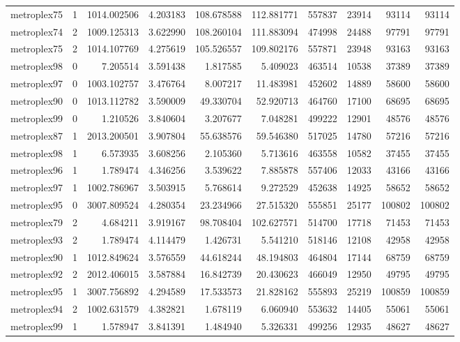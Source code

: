\begin{longtable}{|l|r|r|r|r|r|r|r|r|r|}
metroplex75 & 1 & 1014.002506 & 4.203183 & 108.678588 & 112.881771 & 557837 & 23914 & 93114 & 93114 \\
metroplex74 & 2 & 1009.125313 & 3.622990 & 108.260104 & 111.883094 & 474998 & 24488 & 97791 & 97791 \\
metroplex75 & 2 & 1014.107769 & 4.275619 & 105.526557 & 109.802176 & 557871 & 23948 & 93163 & 93163 \\
metroplex98 & 0 & 7.205514 & 3.591438 & 1.817585 & 5.409023 & 463514 & 10538 & 37389 & 37389 \\
metroplex97 & 0 & 1003.102757 & 3.476764 & 8.007217 & 11.483981 & 452602 & 14889 & 58600 & 58600 \\
metroplex90 & 0 & 1013.112782 & 3.590009 & 49.330704 & 52.920713 & 464760 & 17100 & 68695 & 68695 \\
metroplex99 & 0 & 1.210526 & 3.840604 & 3.207677 & 7.048281 & 499222 & 12901 & 48576 & 48576 \\
metroplex87 & 1 & 2013.200501 & 3.907804 & 55.638576 & 59.546380 & 517025 & 14780 & 57216 & 57216 \\
metroplex98 & 1 & 6.573935 & 3.608256 & 2.105360 & 5.713616 & 463558 & 10582 & 37455 & 37455 \\
metroplex96 & 1 & 1.789474 & 4.346256 & 3.539622 & 7.885878 & 557406 & 12033 & 43166 & 43166 \\
metroplex97 & 1 & 1002.786967 & 3.503915 & 5.768614 & 9.272529 & 452638 & 14925 & 58652 & 58652 \\
metroplex95 & 0 & 3007.809524 & 4.280354 & 23.234966 & 27.515320 & 555851 & 25177 & 100802 & 100802 \\
metroplex79 & 2 & 4.684211 & 3.919167 & 98.708404 & 102.627571 & 514700 & 17718 & 71453 & 71453 \\
metroplex93 & 2 & 1.789474 & 4.114479 & 1.426731 & 5.541210 & 518146 & 12108 & 42958 & 42958 \\
metroplex90 & 1 & 1012.849624 & 3.576559 & 44.618244 & 48.194803 & 464804 & 17144 & 68759 & 68759 \\
metroplex92 & 2 & 2012.406015 & 3.587884 & 16.842739 & 20.430623 & 466049 & 12950 & 49795 & 49795 \\
metroplex95 & 1 & 3007.756892 & 4.294589 & 17.533573 & 21.828162 & 555893 & 25219 & 100859 & 100859 \\
metroplex94 & 2 & 1002.631579 & 4.382821 & 1.678119 & 6.060940 & 553632 & 14405 & 55061 & 55061 \\
metroplex99 & 1 & 1.578947 & 3.841391 & 1.484940 & 5.326331 & 499256 & 12935 & 48627 & 48627 \\

\end{longtable}
